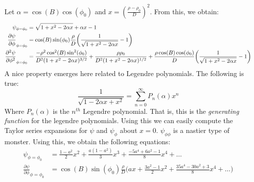 \documentclass[crop=false,class=book,oneside]{standalone}
\begin{document}
            Let $\alpha=\cos(B)\cos(\phi_{0})$ and
            $x=(\frac{\rho-\rho_{0}}{D})^{2}$.
            From this, we obtain:
            \begin{align*}
                \psi_{\phi=\phi_{0}}
                &=\sqrt{1+x^{2}-2\alpha{x}}+\alpha{x}-1\\
                \frac{\partial\psi}
                     {\partial\phi}_{\phi=\phi_{0}}
                &=\cos(B)\sin(\phi_{0})\frac{\rho}{D}
                \bigg(
                    \frac{1}{\sqrt{1+x^{2}-2\alpha{x}}}-1
                \bigg)\\
                \frac{\partial^{2}\psi}
                     {\partial\phi^{2}}_{\phi=\phi_{0}}
                &=\frac{%
                      -\rho^{2}\cos^{2}(B)\sin^{2}(\phi_{0})
                  }{%
                    D^{2}(1+x^{2}-2\alpha{x})^{3/2}
                  }
                  +\frac{\rho\rho_{0}}
                        {D^{2}(1+x^{2}-2\alpha{x})^{1/2}}
                  +\frac{\rho\cos(B)\cos(\phi_{0})}
                        {D}
                  \bigg(
                      \frac{1}{\sqrt{1+x^{2}-2\alpha{x}}}-1
                  \bigg)
            \end{align*}
            A nice property emerges here related to
            Legendre polynomials. The following is true:
            \begin{equation*}
                \frac{1}{\sqrt{1-2\alpha{x}+x^{2}}}
                =\sum_{n=0}^{\infty}P_{n}(\alpha)x^{n}
            \end{equation*}
            Where $P_{n}(\alpha)$ is the $n^{th}$
            Legendre polynomial. That is, this is
            the \textit{generating function} for the
            legendre polynomials. Using this we can
            easily compute the Taylor series expansions
            for $\psi$ and $\psi_{\phi}$ about $x=0$.
            $\psi_{\phi\phi}$ is a nastier type of monster.
            Using this, we obtain the following equations:
            \begin{align*}
                \psi_{\phi=\phi_{0}}
                &=\frac{1-a^{2}}{2}x^{2}
                 +\frac{a(1-a^{2})}{3}x^{3}
                 +\frac{-5a^{4}+6a^{2}-1}{8}x^{4}+\hdots\\
                  \frac{\partial\psi}
                       {\partial\phi}_{\phi=\phi_{0}}
                &=\cos(B)\sin(\phi_{0})\frac{\rho}{D}
                  \bigg(
                      ax+\frac{3a^{2}-1}{2}x^{2}
                      +\frac{35a^{4}-30a^{2}+3}{8}x^{4}
                      +\hdots
                  \bigg)
            \end{align*}
\end{document}
